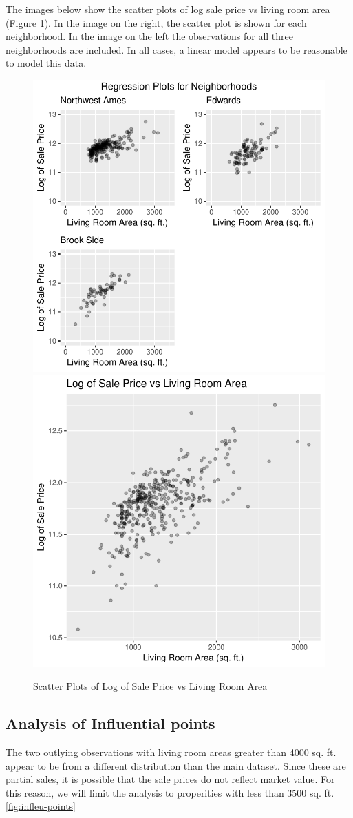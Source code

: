 \documentclass[american,]{article}
\theoremstyle{definition}
\theoremstyle{definition}
\theoremstyle{definition}
\theoremstyle{remark}
\begin{document}
The images below show the scatter plots of log sale price vs living room
area (Figure \ref{fig:scatter-plots}). In the image on the right, the
scatter plot is shown for each neighborhood. In the image on the left
the observations for all three neighborhoods are included. In all cases,
a linear model appears to be reasonable to model this data.

\begin{figure}[htbp]

{\centering \includegraphics[width=0.45\linewidth]{HousePriceRegressionAnalysis_files/figure-latex/scatter-plots-1} \includegraphics[width=0.45\linewidth]{HousePriceRegressionAnalysis_files/figure-latex/scatter-plots-2} 

}

\caption{Scatter Plots of Log of Sale Price vs Living Room Area}\label{fig:scatter-plots}
\end{figure}

\hypertarget{analysis-of-influential-points}{%
\subsection{Analysis of Influential
points}\label{analysis-of-influential-points}}

\label{appendix:infleu-points}

The two outlying observations with living room areas greater than 4000
sq. ft. appear to be from a different distribution than the main
dataset. Since these are partial sales, it is possible that the sale
prices do not reflect market value. For this reason, we will limit the
analysis to properities with less than 3500 sq. ft.
\ref{fig:infleu-points}
\end{document}

